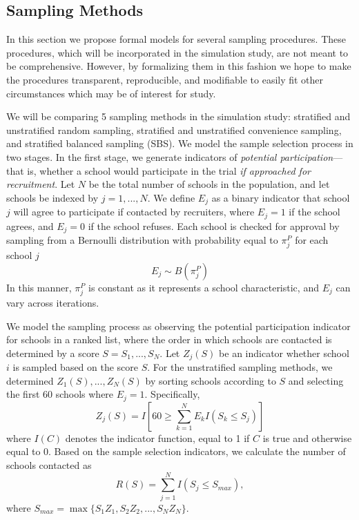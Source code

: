 \documentclass[english,man,floatsintext]{apa6}
\begin{document}
\hypertarget{sampling-methods}{%
\subsection{Sampling Methods}\label{sampling-methods}}

In this section we propose formal models for several sampling procedures. These procedures, which will be incorporated in the simulation study, are not meant to be comprehensive. However, by formalizing them in this fashion we hope to make the procedures transparent, reproducible, and modifiable to easily fit other circumstances which may be of interest for study.

We will be comparing 5 sampling methods in the simulation study: stratified and unstratified random sampling, stratified and unstratified convenience sampling, and stratified balanced sampling (SBS). We model the sample selection process in two stages. In the first stage, we generate indicators of \emph{potential participation}---that is, whether a school would participate in the trial \emph{if approached for recruitment}. Let \(N\) be the total number of schools in the population, and let schools be indexed by \(j = 1, ..., N\). We define \(E_j\) as a binary indicator that school \(j\) will agree to participate if contacted by recruiters, where \(E_j = 1\) if the school agrees, and \(E_j = 0\) if the school refuses. Each school is checked for approval by sampling from a Bernoulli distribution with probability equal to \(\pi^P_j\) for each school \(j\)
\begin{equation}
\label{eq:Ej}
E_j \sim B(\pi^P_j)
\end{equation}
In this manner, \(\pi^P_j\) is constant as it represents a school characteristic, and \(E_j\) can vary across iterations.

We model the sampling process as observing the potential participation indicator for schools in a ranked list, where the order in which schools are contacted is determined by a score \(S = S_1,...,S_N\). Let \(Z_j(S)\) be an indicator whether school \(i\) is sampled based on the score \(S\).
For the unstratified sampling methods, we determined \(Z_1(S),...,Z_N(S)\) by sorting schools according to \(S\) and selecting the first 60 schools where \(E_j = 1\).
Specifically,
\begin{equation}
\label{eq:Zj}
Z_j(S) = I\left[60 \geq \sum_{k=1}^N E_k I\left(S_k \leq S_j\right)\right]
\end{equation}
where \(I(C)\) denotes the indicator function, equal to 1 if \(C\) is true and otherwise equal to 0. Based on the sample selection indicators, we calculate the number of schools contacted as
\begin{equation}
\label{eq:R}
R(S) = \sum_{j=1}^N I(S_j \leq S_{max}),
\end{equation}
where \(S_{max} = \max \{S_1 Z_1, S_2 Z_2, ..., S_N Z_N\}\).
\end{document}
